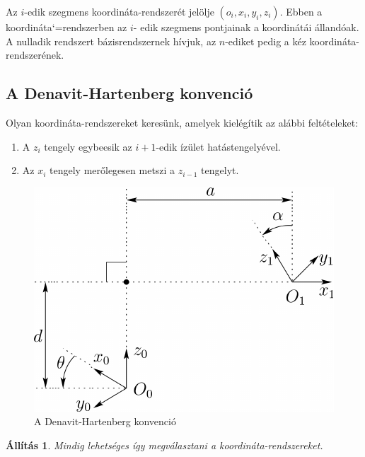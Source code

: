 \documentclass[12pt,a4paper]{report}
\newtheorem{áll}[tét]{Állítás}
\theoremstyle{remark}
\theoremstyle{definition}
\begin{document}
Az $i$-edik szegmens koordináta-rendszerét jelölje $(o_i, x_i, y_i, z_i)$. Ebben a koordináta`=rendszerben az $i$-
edik szegmens pontjainak a koordinátái állandóak. A nulladik rendszert bázisrendszernek hívjuk, az $n$-ediket pedig 
a kéz koordináta-rendszerének.

\subsection{A Denavit-Hartenberg konvenció}
Olyan koordináta-rendszereket keresünk, amelyek kielégítik az alábbi feltételeket:

\begin{enumerate}[label=(\alph*)]
\item A $z_i$ tengely egybeesik az $i+1$-edik ízület hatástengelyével. \label{itm:zaxis}
\item Az $x_i$ tengely merőlegesen metszi a $z_{i-1}$ tengelyt. \label{itm:xaxis}
\end{enumerate}

\begin{figure}[h]
\centering
\includegraphics[width=0.5\linewidth]{./images/DH_convention}
\caption{A Denavit-Hartenberg konvenció}
\end{figure}

\begin{áll}
Mindig lehetséges így megválasztani a koordináta-rendszereket.
\end{áll}
\end{document}
